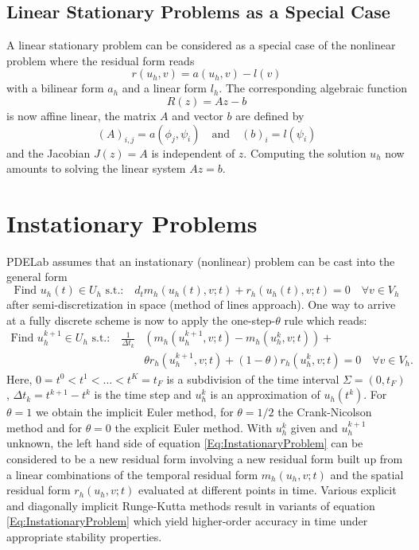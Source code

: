 \documentclass[a4paper,12pt]{article}
\theoremstyle{definition}
\begin{document}
\subsection*{Linear Stationary Problems as a Special Case}

A linear stationary problem can be considered as a special case
of the nonlinear problem where the residual form reads
\begin{equation}
r(u_h,v) = a(u_h,v) -l(v)
\end{equation}
with a bilinear form $a_h$ and a linear form $l_h$.
The corresponding algebraic function
\begin{equation*}
R(z) = Az-b
\end{equation*}
is now affine linear, the matrix $A$ and vector $b$ are defined by
\begin{equation*}
(A)_{i,j} = a(\phi_j,\psi_i) \quad\text{and}\quad (b)_i = l(\psi_i)
\end{equation*}
and the Jacobian $J(z)=A$ is independent of $z$. Computing the solution
$u_h$ now amounts to solving the linear system $Az=b$.

\section{Instationary Problems}

PDELab assumes that an instationary (nonlinear) problem can be cast into the
general form
\begin{equation}
\text{Find $u_h(t)\in U_h$ s.t.:} 
\quad d_t m_h(u_h(t),v;t) + r_h(u_h(t),v;t) = 0 
\quad \forall v\in V_h
\label{Eq:Instationary}
\end{equation}
after semi-discretization in space (method of lines approach).
One way to arrive at a fully discrete scheme is now to 
apply the one-step-$\theta$ rule which reads:
\begin{equation}
\label{Eq:InstationaryProblem}
\begin{split}
\text{Find $u_h^{k+1}\in U_h$ s.t.:} 
\quad \frac{1}{\Delta t_k}&(m_h(u_h^{k+1},v;t)-m_h(u_h^{k},v;t)) + \\
&\theta r_h(u_h^{k+1},v;t) + (1-\theta) r_h(u_h^{k},v;t) = 0 
\quad \forall v\in V_h.
\end{split}
\end{equation}
Here, $0=t^0 < t^1 < \ldots < t^K=t_F$ is a subdivision of the 
time interval $\Sigma=(0,t_F)$, $\Delta t_k = t^{k+1}-t^k$ is the time step
and $u_h^{k}$ is an approximation of $u_h(t^k)$. For $\theta=1$
we obtain the implicit Euler method, for $\theta=1/2$ the Crank-Nicolson method
and for $\theta=0$ the explicit Euler method. With $u_h^k$ given
and $u_h^{k+1}$ unknown, the left hand side of equation \eqref{Eq:InstationaryProblem}
can be considered to be a new residual form involving a new residual form
built up from a linear combinations of the temporal residual form $m_h(u_h,v;t)$
and the spatial residual form $r_h(u_h,v;t)$ evaluated at different points in time.
Various explicit and diagonally implicit Runge-Kutta \cite{alexander:77} 
methods result in variants of
equation \eqref{Eq:InstationaryProblem} which yield higher-order accuracy in
time under appropriate stability properties.
\end{document}
